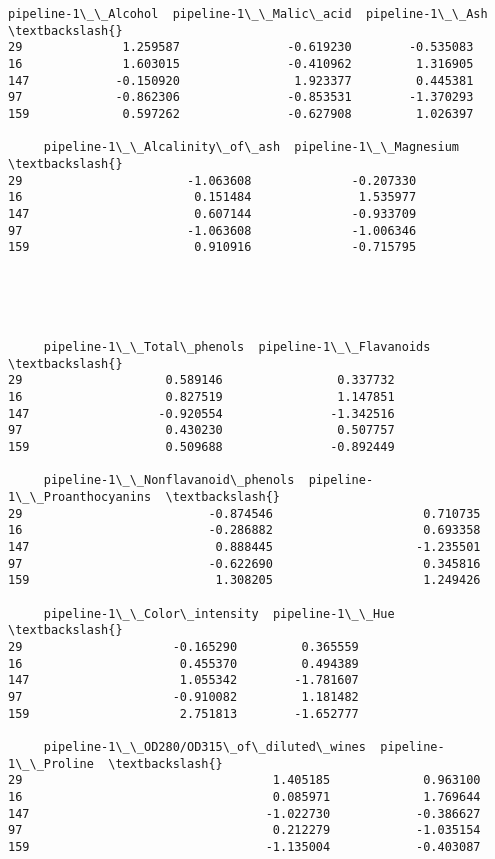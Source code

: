 \documentclass[11pt]{article}
\makeatletter
\newcommand{\boxspacing}{\kern\kvtcb@left@rule\kern\kvtcb@boxsep}
\newcommand{\prompt}[4]{
        {\ttfamily\llap{{\color{#2}[#3]:\hspace{3pt}#4}}\vspace{-\baselineskip}}
    }
\makeatother
\begin{document}
            \begin{tcolorbox}[breakable, size=fbox, boxrule=.5pt, pad at break*=1mm, opacityfill=0]
\prompt{Out}{outcolor}{19}{\boxspacing}
\begin{Verbatim}[commandchars=\\\{\}]
     pipeline-1\_\_Alcohol  pipeline-1\_\_Malic\_acid  pipeline-1\_\_Ash  \textbackslash{}
29              1.259587               -0.619230        -0.535083
16              1.603015               -0.410962         1.316905
147            -0.150920                1.923377         0.445381
97             -0.862306               -0.853531        -1.370293
159             0.597262               -0.627908         1.026397

     pipeline-1\_\_Alcalinity\_of\_ash  pipeline-1\_\_Magnesium  \textbackslash{}
29                       -1.063608              -0.207330
16                        0.151484               1.535977
147                       0.607144              -0.933709
97                       -1.063608              -1.006346
159                       0.910916              -0.715795





     pipeline-1\_\_Total\_phenols  pipeline-1\_\_Flavanoids  \textbackslash{}
29                    0.589146                0.337732
16                    0.827519                1.147851
147                  -0.920554               -1.342516
97                    0.430230                0.507757
159                   0.509688               -0.892449

     pipeline-1\_\_Nonflavanoid\_phenols  pipeline-1\_\_Proanthocyanins  \textbackslash{}
29                          -0.874546                     0.710735
16                          -0.286882                     0.693358
147                          0.888445                    -1.235501
97                          -0.622690                     0.345816
159                          1.308205                     1.249426

     pipeline-1\_\_Color\_intensity  pipeline-1\_\_Hue  \textbackslash{}
29                     -0.165290         0.365559
16                      0.455370         0.494389
147                     1.055342        -1.781607
97                     -0.910082         1.181482
159                     2.751813        -1.652777

     pipeline-1\_\_OD280/OD315\_of\_diluted\_wines  pipeline-1\_\_Proline  \textbackslash{}
29                                   1.405185             0.963100
16                                   0.085971             1.769644
147                                 -1.022730            -0.386627
97                                   0.212279            -1.035154
159                                 -1.135004            -0.403087


\end{Verbatim}
\end{tcolorbox}
\end{document}
